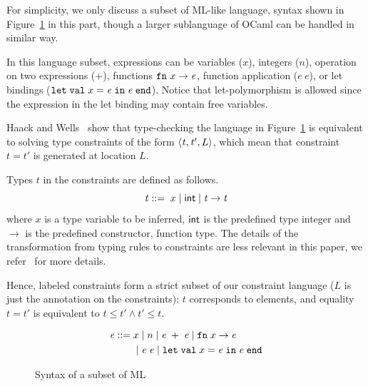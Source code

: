 For simplicity, we only discuss a subset of ML-like language, syntax shown in
Figure~\ref{figure:mltypes} in this part, though a larger sublanguage
of OCaml can be handled in similar way.

\newcommand\expr{\mathit{e}}
\newcommand\ty{\mathit{t}}

In this language subset, expressions can be variables ($x$), integers ($n$),
operation on two expressions ($+$), functions $\fn~x\rightarrow \expr$, function
application ($\expr~\expr$), or let bindings ($\kwlet\; \val\; x = \expr\; \kwin\;
\expr\; \kwend$). Notice that let-polymorphism is allowed since the expression in
the let binding may contain free variables.

Haack and Wells~\cite{haack:slicing} show that type-checking the language in
Figure~\ref{figure:mltypes} is equivalent to solving type constraints
of the
form $\configThree{\ty}{\ty'}{L}$, which mean that constraint $\ty = \ty'$ is
generated at location $L$. 

Types $\ty$ in the constraints are defined as follows.
\[\ty ::=\; x \mid \atom{int} \mid \ty \rightarrow \ty\]
\noindent where $x$ is a type variable to be inferred, $\textsf{int}$ is the predefined type integer and
$\rightarrow$ is the predefined constructor, function type. The details of the
transformation from typing rules to constraints are less relevant in this
paper, we refer~\cite{haack:slicing} for more details. 

Hence, labeled constraints form a strict subset of our constraint
language ($L$ is just the annotation on the constraints): $\ty$
corresponds to elements, and equality $\ty=\ty'$ is equivalent to
$\ty\leq \ty' \land \ty'\leq \ty$. 

\begin{figure}
\begin{minipage}{2in}
\begin{align*}
\expr ::=\; & x \mid n \mid \expr\; + \; \expr \mid \fn\; x \rightarrow \expr \\
        & \mid \expr\; \expr \mid \kwlet\; \val\; x = \expr\; \kwin\; \expr\; \kwend\\
\end{align*}
\end{minipage}
\caption{Syntax of a subset of ML}
\label{figure:mltypes}
\end{figure}


% 

